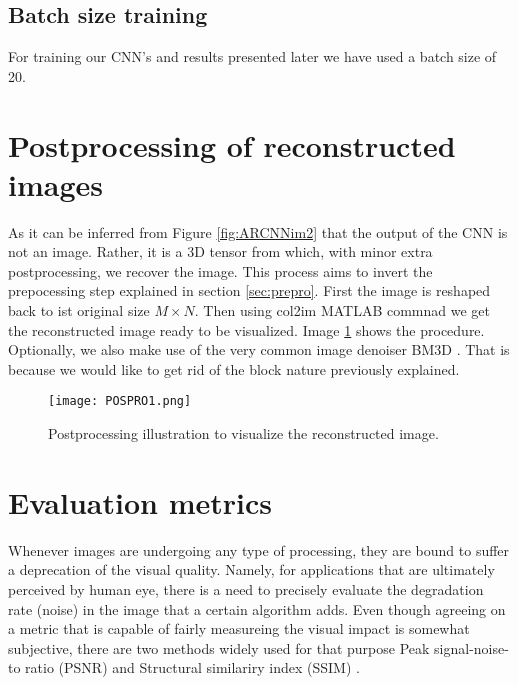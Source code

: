 \FloatBarrier

\subsection{Batch size training}  
For training our CNN's and results presented later we have used a batch size of 20. 

\FloatBarrier


\section{Postprocessing of reconstructed images}
As it can be inferred from Figure \ref{fig:ARCNNim2} that the output of the CNN is not an image. Rather, it is a 3D tensor from which, with minor extra postprocessing, we recover the image. This process aims to invert the prepocessing step explained in section \ref{sec:prepro}. 
\newline
First the image is reshaped back to ist original size $M \times N$. Then using col2im MATLAB commnad we get the reconstructed image ready to be visualized. Image \ref{fig:Posproim1} shows the procedure. Optionally, we also make use of the very common image denoiser BM3D \cite{dabov2007image}. That is because we would like to get rid of the block nature previously explained. 

\begin{figure}[!htb]
\centering 
\texttt{[image: POSPRO1.png]} 
\caption[Postprocessing of recovered images ]{Postprocessing illustration to visualize the reconstructed image.}
\label{fig:Posproim1} 
\end{figure}

\FloatBarrier

\section{Evaluation metrics}
Whenever images are undergoing any type of processing, they are bound to suffer a deprecation of the visual quality. Namely, for applications that are ultimately perceived by human eye, there is a need to precisely evaluate the degradation rate (noise) in the image that a certain algorithm adds. Even though agreeing on a metric that is capable of fairly measureing the visual impact is somewhat subjective, there are two methods widely used for that purpose Peak signal-noise-to ratio (PSNR) and Structural similariry index (SSIM) \cite{wang2004image}.     


